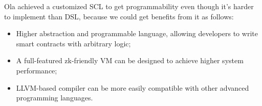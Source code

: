  Ola achieved a customized SCL to get programmability even though it's harder to implement than DSL, because we could get benefits from it as follows:
 \begin{itemize}
 \item Higher abstraction and programmable language, allowing developers to write smart contracts with arbitrary logic;
 \item A full-featured zk-friendly VM can be designed to achieve higher system performance;
 \item LLVM-based compiler can be more easily compatible with other advanced programming languages.
\end{itemize}
